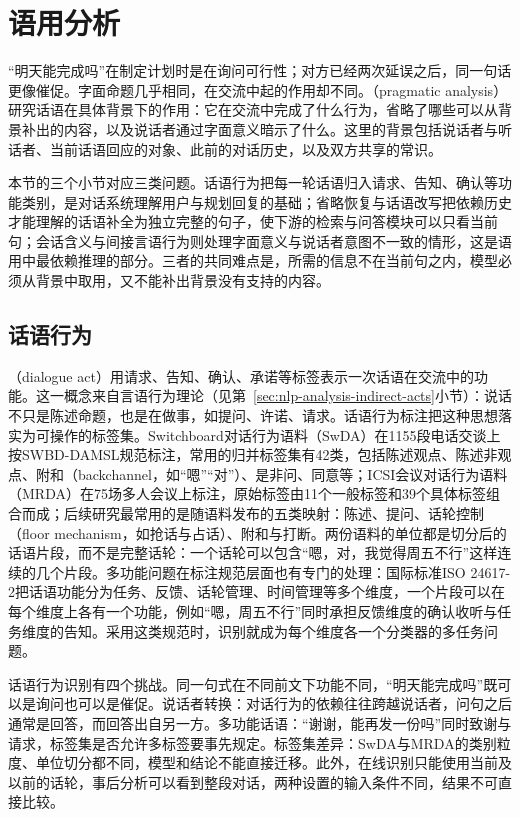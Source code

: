 \section{语用分析}
\label{sec:nlp-analysis-pragmatics}

“明天能完成吗”在制定计划时是在询问可行性；对方已经两次延误之后，同一句话更像催促。字面命题几乎相同，在交流中起的作用却不同。（pragmatic analysis）研究话语在具体背景下的作用：它在交流中完成了什么行为，省略了哪些可以从背景补出的内容，以及说话者通过字面意义暗示了什么。这里的背景包括说话者与听话者、当前话语回应的对象、此前的对话历史，以及双方共享的常识。

本节的三个小节对应三类问题。话语行为把每一轮话语归入请求、告知、确认等功能类别，是对话系统理解用户与规划回复的基础；省略恢复与话语改写把依赖历史才能理解的话语补全为独立完整的句子，使下游的检索与问答模块可以只看当前句；会话含义与间接言语行为则处理字面意义与说话者意图不一致的情形，这是语用中最依赖推理的部分。三者的共同难点是，所需的信息不在当前句之内，模型必须从背景中取用，又不能补出背景没有支持的内容。

\subsection{话语行为}
\label{sec:nlp-analysis-dialogue-acts}

（dialogue act）用请求、告知、确认、承诺等标签表示一次话语在交流中的功能。这一概念来自言语行为理论（见第~\ref{sec:nlp-analysis-indirect-acts}小节）：说话不只是陈述命题，也是在做事，如提问、许诺、请求。话语行为标注把这种思想落实为可操作的标签集。Switchboard对话行为语料（SwDA）在1155段电话交谈上按SWBD-DAMSL规范标注，常用的归并标签集有42类，包括陈述观点、陈述非观点、附和（backchannel，如“嗯”“对”）、是非问、同意等\cite{nlp-analysis-jurafsky1997swbd}；ICSI会议对话行为语料（MRDA）在75场多人会议上标注，原始标签由11个一般标签和39个具体标签组合而成；后续研究最常用的是随语料发布的五类映射：陈述、提问、话轮控制（floor mechanism，如抢话与占话）、附和与打断。两份语料的单位都是切分后的话语片段，而不是完整话轮：一个话轮可以包含“嗯，对，我觉得周五不行”这样连续的几个片段。多功能问题在标注规范层面也有专门的处理：国际标准ISO 24617-2把话语功能分为任务、反馈、话轮管理、时间管理等多个维度，一个片段可以在每个维度上各有一个功能，例如“嗯，周五不行”同时承担反馈维度的确认收听与任务维度的告知。采用这类规范时，识别就成为每个维度各一个分类器的多任务问题。

话语行为识别有四个挑战。同一句式在不同前文下功能不同，“明天能完成吗”既可以是询问也可以是催促。说话者转换：对话行为的依赖往往跨越说话者，问句之后通常是回答，而回答出自另一方。多功能话语：“谢谢，能再发一份吗”同时致谢与请求，标签集是否允许多标签要事先规定。标签集差异：SwDA与MRDA的类别粒度、单位切分都不同，模型和结论不能直接迁移。此外，在线识别只能使用当前及以前的话轮，事后分析可以看到整段对话，两种设置的输入条件不同，结果不可直接比较。

